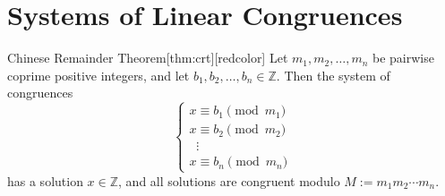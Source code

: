\documentclass[11pt]{article}
\begin{document}
\newpage

\section*{Systems of Linear Congruences}


\begin{define}{Chinese Remainder Theorem}[thm:crt][redcolor]
  Let $m_1, m_2, \dots, m_n$ be pairwise coprime positive integers, and let $b_1, b_2, \dots, b_n \in \mathbb{Z}$. Then the system of congruences
  \[
    \begin{cases}
      x \equiv b_1 \pmod{m_1} \\
      x \equiv b_2 \pmod{m_2} \\
      \;\;\vdots \\
      x \equiv b_n \pmod{m_n}
    \end{cases}
  \]
  has a solution $x \in \mathbb{Z}$, and all solutions are congruent modulo $M := m_1 m_2 \cdots m_n$.
\end{define}
\end{document}
